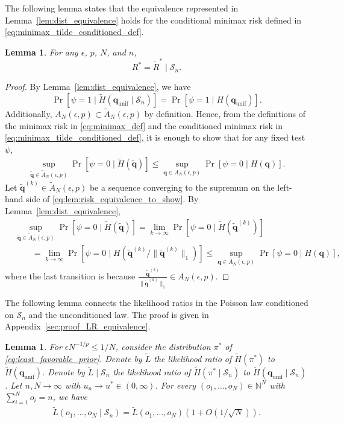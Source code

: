 \documentclass[11pt]{article}
\newtheorem{lem}[thm]{Lemma}
\numberwithin{equation}{section}
\newcommand{\unif}{\mathrm{unif}}
\newcommand{\Scal}{\mathcal{S}}
\newcommand{\Prp}[1]{\Pr\left[#1 \right]}
\begin{document}
The following lemma states that the equivalence represented in Lemma~\ref{lem:dist_equivalence} holds for the conditional minimax risk defined in \eqref{eq:minimax_tilde_conditioned_def}.
\begin{lem}
\label{lem:risk_equivalence}
    For any $\epsilon$, $p$, $N$, and $n$, 
    \[
    R^* = \tilde{R}^*\mid \Scal_n.
    \]
\end{lem}
\begin{proof}
By Lemma~\ref{lem:dist_equivalence}, we have
    \[
    \Prp{\psi = 1 \mid \tilde{H}(\mathbf{q}_{\unif} \mid \Scal_n)} = \Prp{\psi = 1 \mid H(\mathbf{q}_{\unif})}.
    \]
    Additionally, $A_N(\epsilon,p) \subset \tilde{A}_N(\epsilon,p)$ by definition. Hence, from the definitions of the minimax risk in \eqref{eq:minimax_def} and the conditioned minimax risk in \eqref{eq:minimax_tilde_conditioned_def}, it is enough to show that for any fixed test $\psi$, 
    \begin{align}
        \label{eq:lem:risk_equivalence_to_show}
    \sup_{\tilde{\mathbf{q}} \in \tilde{A}_N(\epsilon,p)} \Prp{\psi = 0 \mid \tilde{H}(\tilde{\mathbf{q}})} \leq \sup_{\mathbf{q} \in A_N(\epsilon,p)} \Prp{\psi = 0 \mid H(\mathbf{q})}.
    \end{align}
    Let $\tilde{\mathbf{q}}^{(k)} \in \tilde{A}_N(\epsilon,p)$ be a sequence converging to the supremum on the left-hand side of \eqref{eq:lem:risk_equivalence_to_show}. 
    By Lemma~\ref{lem:dist_equivalence}, 
    \begin{align*}
        & \sup_{\tilde{\mathbf{q}} \in \tilde{A}_N(\epsilon,p)} \Prp{\psi = 0 \mid \tilde{H}(\tilde{\mathbf{q}})} = \lim_{k \to \infty} \Prp{\psi = 0 \mid \tilde{H}(\tilde{\mathbf{q}}^{(k)})} \\
        & \qquad = \lim_{k \to \infty} \Prp{\psi = 0 \mid H(\tilde{\mathbf{q}}^{(k)}/\|\tilde{\mathbf{q}}^{(k)}\|_1)} \leq \sup_{\mathbf{q} \in A_N(\epsilon,p)} \Prp{\psi = 0 \mid H(\mathbf{q})},
    \end{align*}
where the last transition is because $\frac{\tilde{\mathbf{q}}^{(k)}}{\|\tilde{\mathbf{q}}^{(k)}\|_1} \in A_N(\epsilon,p)$.
\end{proof}

The following lemma connects the likelihood ratios in the Poisson law conditioned on $\Scal_n$ and the unconditioned law. The proof is given in Appendix~\ref{sec:proof_LR_equivalence}.
\begin{lem}
\label{lem:LR_equivalence}
For $\epsilon N^{-1/p} \leq 1/N$, consider the distribution $\pi^*$ of \eqref{eq:least_favorable_prior}. Denote by $\tilde{L}$ the likelihood ratio of $\tilde{H}(\pi^*)$ to $\tilde{H}(\mathbf{q}_{\unif})$. Denote by $\tilde{L}\mid \Scal_n$ the likelihood ratio of 
    $\tilde{H}(\pi^* \mid \Scal_n)$ to $\tilde{H}(\mathbf{q}_{\unif} \mid \Scal_n)$. Let $n,N \to \infty$ with $u_n \to u^* \in (0,\infty)$. For every $(o_1,\ldots,o_N) \in \mathbb{N}^N$ with $\sum_{i=1}^N o_i = n$, we have
    \begin{align*}
    \tilde{L} (o_1,\ldots,o_N \mid \Scal_n) = \tilde{L}(o_1,\ldots,o_N)(1 + O(1/\sqrt{N})).
    \end{align*}
\end{lem}
\end{document}
